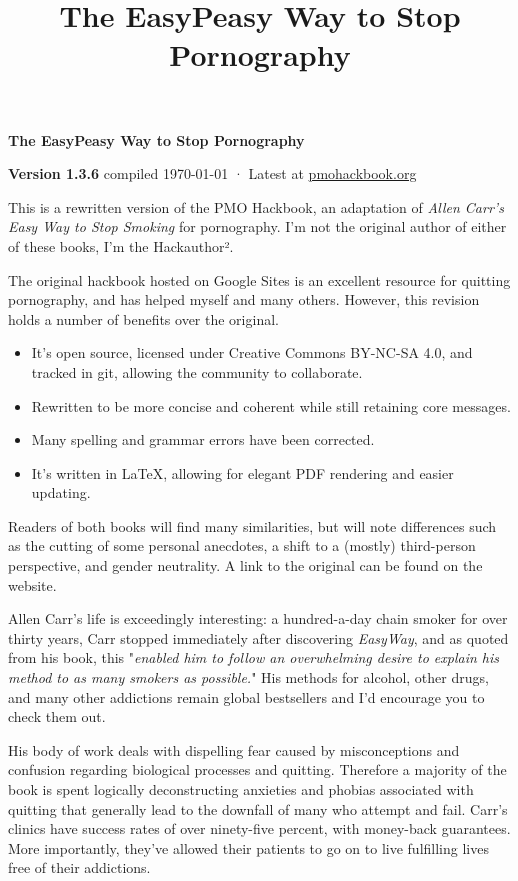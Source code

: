 \documentclass[easypeasy.tex]{subfiles}
\title {The EasyPeasy Way to Stop Pornography}
\begin{document}
\thispagestyle{empty}

\begin{center}
  {\Huge\bfseries The EasyPeasy Way to Stop Pornography \par}
  {\small \textbf{Version 1.3.6} compiled {\today} · Latest at \href{https://pmohackbook.org}{pmohackbook.org}}
\end{center}

This is a rewritten version of the PMO Hackbook, an adaptation of \textit{Allen Carr's Easy Way to Stop Smoking} for pornography. I'm not the original author of either of these books, I'm the Hackauthor².

The original hackbook hosted on Google Sites is an excellent resource for quitting pornography, and has helped myself and many others. However, this revision holds a number of benefits over the original.
\begin{itemize}
\item It's open source, licensed under Creative Commons BY-NC-SA 4.0, and tracked in git, allowing the community to collaborate.
\item Rewritten to be more concise and coherent while still retaining core messages.
\item Many spelling and grammar errors have been corrected.
\item It's written in LaTeX, allowing for elegant PDF rendering and easier updating.
\end{itemize}

Readers of both books will find many similarities, but will note differences such as the cutting of some personal anecdotes, a shift to a (mostly) third-person perspective, and gender neutrality. A link to the original can be found on the website.

Allen Carr's life is exceedingly interesting: a hundred-a-day chain smoker for over thirty years, Carr stopped immediately after discovering \textit{EasyWay}, and as quoted from his book, this "\textit{enabled him to follow an overwhelming desire to explain his method to as many smokers as possible.}" His methods for alcohol, other drugs, and many other addictions remain global bestsellers and I'd encourage you to check them out.

His body of work deals with dispelling fear caused by misconceptions and confusion regarding biological processes and quitting. Therefore a majority of the book is spent logically deconstructing anxieties and phobias associated with quitting that generally lead to the downfall of many who attempt and fail. Carr's clinics have success rates of over ninety-five percent, with money-back guarantees. More importantly, they've allowed their patients to go on to live fulfilling lives free of their addictions.
\end{document}
